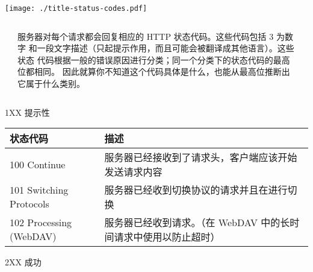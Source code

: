 \documentclass[final,table]{beamer}
\begin{document}
  \begin{frame}{}

    \noindent
    \begin{minipage}{\textwidth}
      \centering
      \texttt{[image: ./title-status-codes.pdf]}
    \end{minipage}

    \begin{columns}
      \begin{column}{0.05\textwidth}
      \end{column}
      \begin{column}{0.9\textwidth}
        \begin{block}{}
          \large
            服务器对每个请求都会回复相应的 HTTP 状态代码。这些代码包括 3 为数字
            和一段文字描述（只起提示作用，而且可能会被翻译成其他语言）。这些状态
            代码根据一般的错误原因进行分类；同一个分类下的状态代码的最高位都相同。
            因此就算你不知道这个代码具体是什么，也能从最高位推断出它属于什么类别。
          \normalsize
        \end{block}
      \end{column}
      \begin{column}{0.05\textwidth}
      \end{column}
    \end{columns}

    \vspace{0.5in}

    \begin{block}{\huge 1XX 提示性}

      \vspace{0.3in}

      \begin{tabular}{p{} p{}}
        状态代码 & 描述\\ \hline
        100 Continue & 服务器已经接收到了请求头，客户端应该开始发送请求内容 \\
        101 Switching Protocols & 服务器已经收到切换协议的请求并且在进行切换 \\
        102 Processing (WebDAV) & 服务器已经收到请求。（在 WebDAV 中的长时间请求中使用以防止超时）\\
      \end{tabular}
    \end{block}
    \begin{block}{\huge 2XX 成功}

      \vspace{0.3in}


\end{block}
\end{frame}
\end{document}
